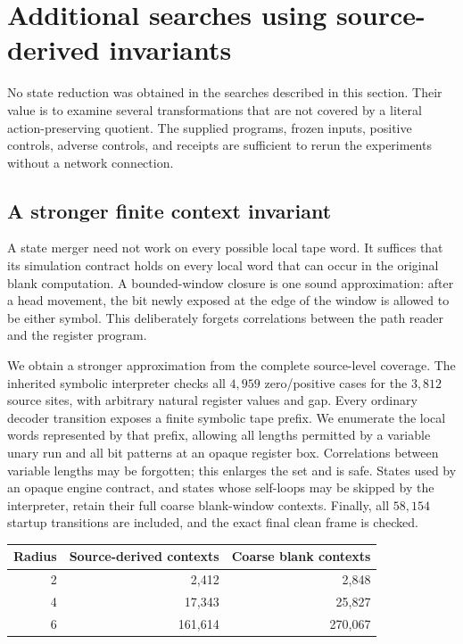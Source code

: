 \section{Additional searches using source-derived invariants}
\label{sec:additional-local-search}

No state reduction was obtained in the searches described in this section.
Their value is to examine several transformations that are not covered by a
literal action-preserving quotient. The supplied programs, frozen inputs,
positive controls, adverse controls, and receipts are sufficient to rerun the
experiments without a network connection.

\subsection{A stronger finite context invariant}

A state merger need not work on every possible local tape word. It suffices
that its simulation contract holds on every local word that can occur in the
original blank computation. A bounded-window closure is one sound
approximation: after a head movement, the bit newly exposed at the edge of the
window is allowed to be either symbol. This deliberately forgets correlations
between the path reader and the register program.

We obtain a stronger approximation from the complete source-level coverage.
The inherited symbolic interpreter checks all $4,959$ zero/positive cases for
the $3,812$ source sites, with arbitrary natural register values and gap.
Every ordinary decoder transition exposes a finite symbolic tape prefix.
We enumerate the local words represented by that prefix, allowing all lengths
permitted by a variable unary run and all bit patterns at an opaque register
box. Correlations between variable lengths may be forgotten; this enlarges
the set and is safe. States used by an opaque engine contract, and states
whose self-loops may be skipped by the interpreter, retain their full coarse
blank-window contexts. Finally, all $58,154$ startup transitions are included,
and the exact final clean frame is checked.

\begin{center}
\begin{tabular}{r|r|r}
Radius & Source-derived contexts & Coarse blank contexts\\\hline
2 & 2,412 & 2,848\\
4 & 17,343 & 25,827\\
6 & 161,614 & 270,067
\end{tabular}
\end{center}


